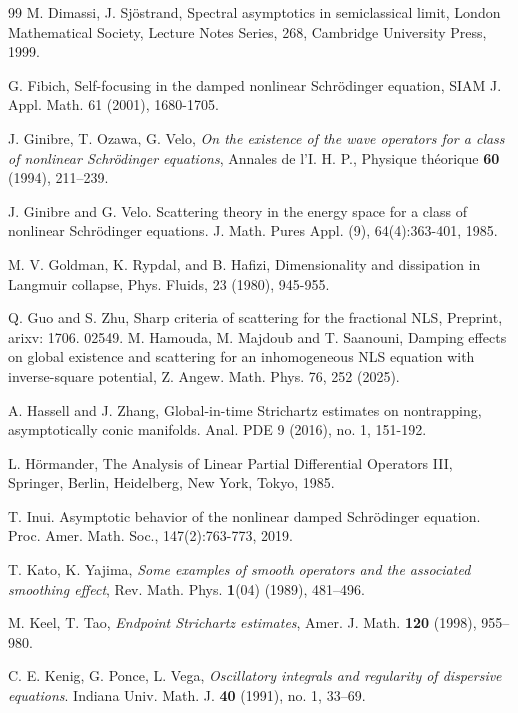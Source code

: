 \documentclass[10pt%
]{amsart}
\numberwithin{equation}{section}
\theoremstyle{definition}
\begin{document}
\begin{thebibliography}{99}
	 M. Dimassi, J. Sj\"ostrand, Spectral asymptotics in semiclassical limit, London Mathematical Society, Lecture Notes Series, 268, Cambridge University Press, 1999.
	
	 G. Fibich, Self-focusing in the damped nonlinear Schr\"odinger equation, SIAM J. Appl. Math. 61 (2001),  1680-1705.
	
	 J. Ginibre, T. Ozawa, G. Velo, {\it On the existence of the wave operators for a class of nonlinear Schr\"odinger equations}, Annales de l'I. H. P., Physique th\'eorique  \textbf{60} (1994), 211--239.
	
	 J. Ginibre and G. Velo. Scattering theory in the energy space for a class of nonlinear Schr\"odinger equations. J. Math. Pures Appl. (9), 64(4):363-401, 1985.
	
	
	 M. V. Goldman, K. Rypdal, and B. Hafizi, Dimensionality and dissipation in Langmuir collapse, Phys. Fluids, 23 (1980), 945-955.
	
	Q. Guo and S. Zhu, Sharp criteria of scattering for the fractional NLS, Preprint, arixv: 1706. 02549.
	M. Hamouda, M. Majdoub and T. Saanouni, Damping effects on global existence and scattering for an inhomogeneous NLS equation with inverse-square potential, Z. Angew. Math. Phys. 76, 252 (2025).
	
A. Hassell and  J. Zhang, 
Global-in-time Strichartz estimates on nontrapping, asymptotically conic manifolds.
Anal. PDE 9 (2016), no. 1, 151-192.

	 L. H\"ormander, The Analysis of Linear Partial Differential Operators III, Springer, Berlin, Heidelberg, New York, Tokyo, 1985.
	
	 T. Inui. Asymptotic behavior of the nonlinear damped Schr\"odinger equation. Proc. Amer. Math. Soc., 147(2):763-773, 2019.
	
	T. Kato, K. Yajima, {\it Some examples of smooth operators and the associated smoothing effect}, Rev. Math. Phys. \textbf{1}(04) (1989), 481--496.
	
	 M. Keel, T. Tao, {\it Endpoint Strichartz estimates}, Amer. J. Math. \textbf{120} (1998), 955--980. 
	
	 C. E. Kenig, G. Ponce, L. Vega, {\it Oscillatory integrals and regularity of dispersive equations}. Indiana Univ. Math. J. \textbf{40} (1991), no. 1, 33--69.
	

\end{thebibliography}
\end{document}
